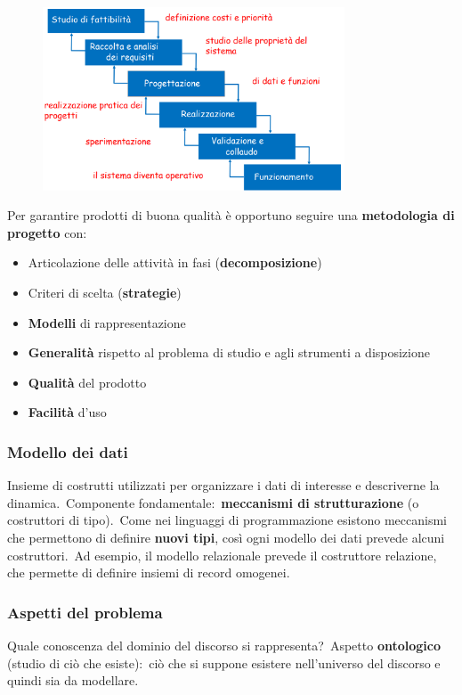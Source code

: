 \begin{figure}[H]
	\centering
	\includegraphics[width=0.8\textwidth]{immagini/Progettazione2.png}
\end{figure}
\noindent Per garantire prodotti di buona qualità è opportuno seguire una \textbf{metodologia di progetto} con:
\begin{itemize}
	\item Articolazione delle attività in fasi (\textbf{decomposizione})
	\item Criteri di scelta (\textbf{strategie})
	\item \textbf{Modelli} di rappresentazione
	\item \textbf{Generalità} rispetto al problema di studio e agli strumenti a disposizione
	\item \textbf{Qualità} del prodotto
	\item \textbf{Facilità} d'uso
\end{itemize}

\subsubsection{Modello dei dati}
Insieme di costrutti utilizzati per organizzare i dati di interesse e descriverne la dinamica.\
Componente fondamentale:\ \textbf{meccanismi di strutturazione} (o costruttori di tipo).\
Come nei linguaggi di programmazione esistono meccanismi che permettono di definire \textbf{nuovi tipi}, così ogni modello dei dati prevede alcuni costruttori.\
Ad esempio, il modello relazionale prevede il costruttore relazione, che permette di definire insiemi di record omogenei.

\subsubsection{Aspetti del problema}
Quale conoscenza del dominio del discorso si rappresenta?\
Aspetto \textbf{ontologico} (studio di ciò che esiste):\ ciò che si suppone esistere nell'universo del discorso e quindi sia da modellare.

